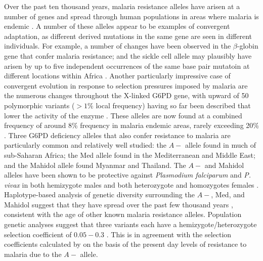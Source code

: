 \documentclass{article}
\begin{document}
Over the past ten thousand years, malaria resistance alleles have arisen at a number of genes 
and spread through human populations in areas where malaria is endemic \citep{Kwiatkowski:05}. 
A number of these alleles appear to be examples of convergent adaptation, 
as different derived mutations in the same gene are seen in different individuals.
For example, 
a number of changes have been observed in the $\beta$-globin gene that confer malaria resistance;
and the sickle cell allele may plausibly have arisen by up to five independent occurrences
of the same base pair mutatoin at different locations within Africa
\citep{Flint:98,ralph2010parallel}.
Another particularly impressive case of convergent evolution in response to
selection pressures imposed by malaria are the numerous changes throughout the X-linked G6PD gene, 
with upward of 50 polymorphic variants ($>1\%$ local frequency) having so far been described 
that lower the activity of the enzyme \citep{Howes-g6pd-variants,Minucci-g6pd}. 
These alleles are now found at a combined frequency of around 8\% frequency in malaria endemic areas,
rarely exceeding 20\% \citep{Howes-g6pd-preval}. 
Three G6PD deficiency alleles that also confer resistance to malaria 
are particularly common and relatively well studied: 
the $A-$ allele found in much of sub-Saharan Africa; 
the Med allele found in the Mediterranean and Middle East; 
and the Mahidol allele found Myanmar and Thailand.
The $A-$ and Mahidol alleles have been shown
to be protective against {\it Plasmodium falciparum} and {\it P. vivax} in both
hemizygote males and both heterozygote and homozygotes females \citep{Ruwende-g6pd, Louicharoen-g6pd}. 
Haplotype-based analysis of genetic diversity surrounding
the $A-$, Med, and Mahidol suggest that they have spread over the past 
few thousand years  \citet{tishkoff-g6pd,Slatkin-age-est,Saunders-g6pd,Louicharoen-g6pd}, 
consistent with the age of other known malaria resistance alleles. 
Population genetic analyses suggest that three variants each have a hemizygote/heterozygote 
selection coefficient of $0.05-0.3$
\citep{tishkoff-g6pd,Slatkin-age-est,Saunders-g6pd,Louicharoen-g6pd}. 
This is in agreement with the selection coefficients calculated by
\citet{Ruwende-g6pd} on the basis of the present day levels of
resistance to malaria due to the $A-$ allele. \\
\end{document}
